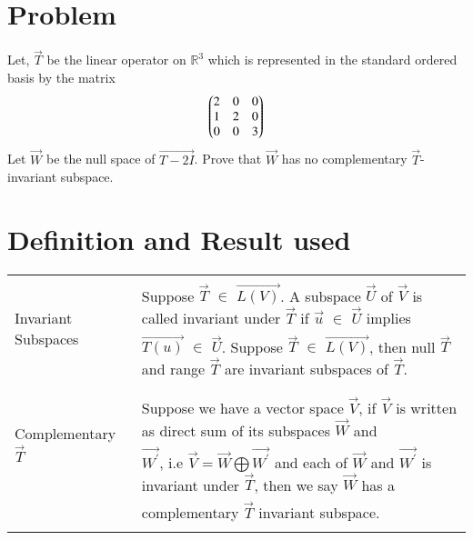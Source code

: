 \documentclass[journal,12pt,twocolumn]{IEEEtran}
\newcommand\myemptypage{
	\null
	\thispagestyle{empty}
	\addtocounter{page}{-1}
	\newpage
}
\begin{document}
\section{Problem}
Let, $\vec{T}$ be the linear operator on $\mathbb{R}^3$ which is represented in the standard ordered
basis by the matrix
\begin{align}
	\begin{pmatrix}2 & 0 & 0 \\ 1 & 2 & 0 \\ 0 & 0 & 3\end{pmatrix}
\end{align}
Let $\vec{W}$ be the null space of $\vec{T-2I}$. Prove that $\vec{W}$ has no complementary $\vec{T}$-invariant
subspace.
\section{Definition and Result used}
\begin{table}[hp]
	\begin{tabular}{|l|l|}
		\hline
		\multirow{3}{*}{Invariant Subspaces} & \\
		& Suppose $\vec{T}$ $\in$ $\vec{L(V)}$. A subspace $\vec{U}$ of $\vec{V}$ is called invariant under $\vec{T}$ if $\vec{u}$ $\in$ $\vec{U}$ implies\\
		& $\vec{T(u)}$ $\in$ $\vec{U}$. Suppose $\vec{T}$ $\in$ $\vec{L(V)}$, then null $\vec{T}$ and range $\vec{T}$ are invariant subspaces of $\vec{T}$.  \\
		& \\
		\hline
		\multirow{3}{*}{Complementary $\vec{T}$} & \\
		& Suppose we have a vector space $\vec{V}$, if $\vec{V}$ is written as direct sum of its subspaces $\vec{W}$ and \\
invariant subspace		& $\vec{W^{'}}$, i.e $\vec{V} = \vec{W} \bigoplus \vec{W^{'}}$ and each of $\vec{W}$ and $\vec{W^{'}}$ is invariant under $\vec{T}$, then we say $\vec{W}$ has a \\
		&  complementary $\vec{T}$ invariant subspace.\\
		&   \\
		\hline
\end{tabular}
\end{table}	
\pagebreak
\myemptypage
\end{document}
